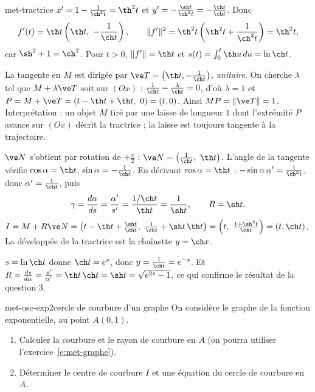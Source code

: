 \begin{corrige}{met-tractrice}
 $x'=1-\frac1{\ch^2t}=\th^2t$ et $y'=-\frac{\sh t}{\ch^2t}=-\frac{\th t}{\ch t}$. Donc
\[f'(t)=\th t\left(\th t,\ -\frac1{\ch t}\right),\qquad\|f'\|^2=\th^2t\left(\th^2t+\frac1{\ch^2t}\right)=\th^2t,\]
car $\sh^2+1=\ch^2$. Pour $t>0$, $\|f'\|=\th t$ et $s(t)=\int_0^t\th u\,du=\ln\ch t$.

 La tangente en $M$ est dirigée par $\ve T=\left(\th t,-\frac1{\ch t}\right)$, \emph{unitaire}. On cherche $\lambda$ tel que $M+\lambda\ve T$ soit sur $(Ox)$ : $\frac1{\ch t}-\frac\lambda{\ch t}=0$, d'où $\lambda=1$ et $P=M+\ve T=(t-\th t+\th t,\ 0)=(t,0)$. Ainsi $MP=\|\ve T\|=1$. Interprétation : un objet $M$ tiré par une laisse de longueur $1$ dont l'extrémité $P$ avance sur $(Ox)$ décrit la tractrice ; la laisse est toujours tangente à la trajectoire.

 $\ve N$ s'obtient par rotation de $+\frac\pi2$ : $\ve N=\left(\frac1{\ch t},\ \th t\right)$. L'angle de la tangente vérifie $\cos\alpha=\th t$, $\sin\alpha=-\frac1{\ch t}$. En dérivant $\cos\alpha=\th t$ : $-\sin\alpha\,\alpha'=\frac1{\ch^2t}$, donc $\alpha'=\frac1{\ch t}$, puis
\[\gamma=\frac{d\alpha}{ds}=\frac{\alpha'}{s'}=\frac{1/\ch t}{\th t}=\frac1{\sh t},\qquad R=\sh t.\]
$I=M+R\ve N=\left(t-\th t+\frac{\sh t}{\ch t},\ \frac1{\ch t}+\sh t\,\th t\right)=\left(t,\ \frac{1+\sh^2t}{\ch t}\right)=(t,\ch t)$. La développée de la tractrice est la chaînette $y=\ch x$.

 $s=\ln\ch t$ donne $\ch t=e^s$, donc $y=\frac1{\ch t}=e^{-s}$. Et $R=\frac{ds}{d\alpha}=\frac{s'}{\alpha'}=\th t\,\ch t=\sh t=\sqrt{e^{2s}-1}$, ce qui confirme le résultat de la question 3.
\end{corrige}

\begin{exo}{met-osc-exp}{2}{cercle de courbure d'un graphe}
On considère le graphe de la fonction exponentielle, au point $A(0,1)$.
\begin{enumerate}
\item Calculer la courbure et le rayon de courbure en $A$ (on pourra utiliser l'exercice~\ref{e:met-graphe}).
\item Déterminer le centre de courbure $I$ et une équation du cercle de courbure en $A$.
\end{enumerate}
\end{exo}

